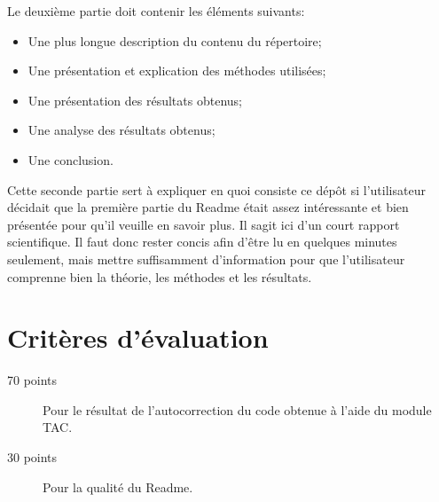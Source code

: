 \documentclass[12pt, letterpaper]{article}
\numberwithin{table}{section}
\numberwithin{figure}{section}
\numberwithin{equation}{section}
\begin{document}
\bigskip

\noindent Le deuxième partie doit contenir les éléments suivants:
\begin{itemize}
    \item Une plus longue description du contenu du répertoire;
    \item Une présentation et explication des méthodes utilisées;
    \item Une présentation des résultats obtenus;
    \item Une analyse des résultats obtenus;
    \item Une conclusion.
\end{itemize}
Cette seconde partie sert à expliquer en quoi consiste ce dépôt si l'utilisateur décidait que la première partie
du Readme était assez intéressante et bien présentée pour qu'il veuille en savoir plus.
Il sagit ici d'un court rapport scientifique.
Il faut donc rester concis afin d'être lu en quelques minutes seulement, mais mettre suffisamment d'information pour
que l'utilisateur comprenne bien la théorie, les méthodes et les résultats.



\section{Critères d'évaluation}\label{sec:criteres-d'evaluation}

\begin{description}
  \item[70 points] Pour le résultat de l'autocorrection du code obtenue à l'aide du module TAC\@.
  \item[30 points] Pour la qualité du Readme.
\end{description}
\end{document}
